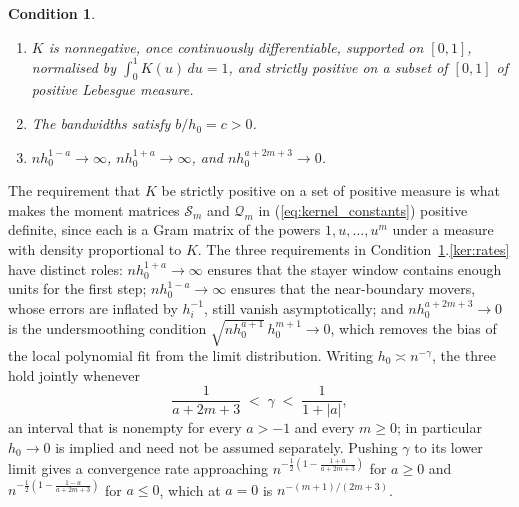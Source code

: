 \documentclass{article}
\newtheorem{condition}{Condition}
\begin{document}
\begin{condition}\label{cond:Kernel}\leavevmode
    \begin{enumerate}
        \item\label{ker:kernel} $K$ is nonnegative, once continuously differentiable, supported on
              $[0,1]$, normalised by $\int_0^1K(u)\,du=1$, and strictly positive
              on a subset of $[0,1]$ of positive Lebesgue measure.
        \item\label{ker:bandwidth} The bandwidths satisfy $b/h_0=c>0$.
        \item\label{ker:rates} $nh_0^{1-a}\to\infty$, $nh_0^{1+a}\to\infty$, and
              $nh_0^{a+2m+3}\to 0$.
    \end{enumerate}
\end{condition}

\noindent
The requirement that $K$ be strictly positive on a set of positive measure is what makes the moment
matrices $\mathcal{S}_m$ and $\mathcal{Q}_m$ in (\ref{eq:kernel_constants}) positive definite, since
each is a Gram matrix of the powers $1,u,\dots,u^m$ under a measure with density proportional to
$K$. The three requirements in Condition~\ref{cond:Kernel}.\ref{ker:rates} have distinct roles:
$nh_0^{1+a}\to\infty$ ensures that the stayer window contains enough units for the first step;
$nh_0^{1-a}\to\infty$ ensures that the near-boundary movers, whose errors are inflated by
$h_i^{-1}$, still vanish asymptotically; and $nh_0^{a+2m+3}\to0$ is the undersmoothing condition
$\sqrt{nh_0^{a+1}}\,h_0^{m+1}\to0$, which removes the bias of the local polynomial fit from the
limit distribution. Writing $h_0\asymp n^{-\gamma}$, the three hold jointly whenever
\[
    \frac{1}{a+2m+3}\;<\;\gamma\;<\;\frac{1}{1+|a|},
\]
an interval that is nonempty for every $a>-1$ and every $m\ge0$; in particular
$h_0\to0$ is implied and need not be assumed separately. Pushing $\gamma$ to its lower limit gives a
convergence rate approaching $n^{-\frac{1}{2}\left(1-\frac{1+a}{a+2m+3}\right)}$ for $a\ge 0$ and $n^{-\frac{1}{2}\left(1-\frac{1-a}{a+2m+3}\right)}$ for $a\le 0$, which at $a=0$
is $n^{-(m+1)/(2m+3)}$.
\end{document}
